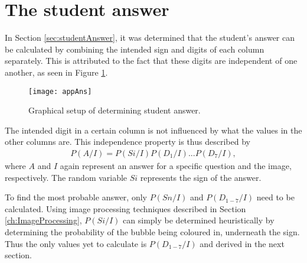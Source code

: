 
\section{The student answer}
In Section \ref{sec:studentAnswer}, it was determined that the student's answer can be calculated by combining the intended sign and digits of each column separately. This is attributed to the fact that these digits are independent of one another, as seen in Figure \ref{fig:appAns}. 

\begin{figure}
  \centering
  \texttt{[image: appAns]}\\
  \caption{Graphical setup of determining student answer.}
  \label{fig:appAns}
\end{figure}
The intended digit in a certain column is not influenced by what the values in the other columns are. This independence property is thus described by\begin{align}
  P(A/I) =  P(Si/I)P(D_1/I)...P(D_7/I),
\label{eqn:ansIndep}
\end{align}
where $A$ and $I$ again represent an answer  for a specific question and the image, respectively. The random variable $Si$ represents the sign of the answer.

To find the most probable answer, only $P(Sn/I)$ and $P(D_{1-7}/I)$ need to be calculated. Using image processing techniques described in Section \ref{ch:ImageProcessing}, $P(Si/I)$ can simply be determined heuristically by determining the probability of the bubble being coloured in, underneath the sign. Thus the only values yet to calculate is $P(D_{1-7}/I)$ and derived in the next section.

